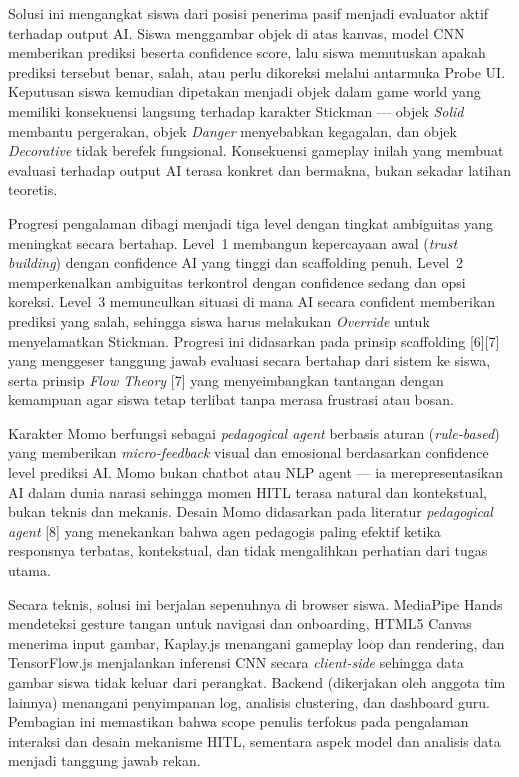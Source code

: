 Solusi ini mengangkat siswa dari posisi penerima pasif menjadi evaluator aktif terhadap output AI. Siswa menggambar objek di atas kanvas, model CNN memberikan prediksi beserta confidence score, lalu siswa memutuskan apakah prediksi tersebut benar, salah, atau perlu dikoreksi melalui antarmuka Probe UI. Keputusan siswa kemudian dipetakan menjadi objek dalam game world yang memiliki konsekuensi langsung terhadap karakter Stickman --- objek \textit{Solid} membantu pergerakan, objek \textit{Danger} menyebabkan kegagalan, dan objek \textit{Decorative} tidak berefek fungsional. Konsekuensi gameplay inilah yang membuat evaluasi terhadap output AI terasa konkret dan bermakna, bukan sekadar latihan teoretis.

Progresi pengalaman dibagi menjadi tiga level dengan tingkat ambiguitas yang meningkat secara bertahap. Level~1 membangun kepercayaan awal (\textit{trust building}) dengan confidence AI yang tinggi dan scaffolding penuh. Level~2 memperkenalkan ambiguitas terkontrol dengan confidence sedang dan opsi koreksi. Level~3 memunculkan situasi di mana AI secara confident memberikan prediksi yang salah, sehingga siswa harus melakukan \textit{Override} untuk menyelamatkan Stickman. Progresi ini didasarkan pada prinsip scaffolding [6][7] yang menggeser tanggung jawab evaluasi secara bertahap dari sistem ke siswa, serta prinsip \textit{Flow Theory} [7] yang menyeimbangkan tantangan dengan kemampuan agar siswa tetap terlibat tanpa merasa frustrasi atau bosan.

Karakter Momo berfungsi sebagai \textit{pedagogical agent} berbasis aturan (\textit{rule-based}) yang memberikan \textit{micro-feedback} visual dan emosional berdasarkan confidence level prediksi AI. Momo bukan chatbot atau NLP agent --- ia merepresentasikan AI dalam dunia narasi sehingga momen HITL terasa natural dan kontekstual, bukan teknis dan mekanis. Desain Momo didasarkan pada literatur \textit{pedagogical agent} [8] yang menekankan bahwa agen pedagogis paling efektif ketika responsnya terbatas, kontekstual, dan tidak mengalihkan perhatian dari tugas utama.

Secara teknis, solusi ini berjalan sepenuhnya di browser siswa. MediaPipe Hands mendeteksi gesture tangan untuk navigasi dan onboarding, HTML5 Canvas menerima input gambar, Kaplay.js menangani gameplay loop dan rendering, dan TensorFlow.js menjalankan inferensi CNN secara \textit{client-side} sehingga data gambar siswa tidak keluar dari perangkat. Backend (dikerjakan oleh anggota tim lainnya) menangani penyimpanan log, analisis clustering, dan dashboard guru. Pembagian ini memastikan bahwa scope penulis terfokus pada pengalaman interaksi dan desain mekanisme HITL, sementara aspek model dan analisis data menjadi tanggung jawab rekan.



